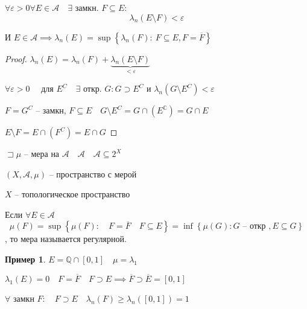\documentclass{book}
\newcommand\Q{\ensuremath{\mathbb{Q}}}
\renewcommand\C{\ensuremath{\mathbb{C}}}
\theoremstyle{definition}
\newtheorem*{example}{Пример}
\begin{document}
\begin{corollary}
    $\forall \varepsilon >0\forall E\in \mathcal A\quad \exists $ замкн. $F \subseteq E:$ \[\lambda_n\left( E \setminus F \right) <\varepsilon\]

    И $E\in\mathcal A \implies   \lambda_n(E) = \sup \left\{ \lambda_n\left( F \right) :\ F\subseteq E, F = \overline{F} \right\} $
\end{corollary}
\begin{proof}
    $\lambda_n(E) = \lambda_n(F) + \underbrace{\lambda_n(E\setminus F)}_{<\varepsilon}$

    $\forall \varepsilon >0\quad $ для $E^C\quad \exists $ откр. $G: G \supset E^C$  и $\lambda_n\left( G \setminus  E^C \right) <\varepsilon$

    $F = G^C$ -- замкн,  $F \subseteq E\quad G \setminus E^C = G \cap \left( E^\C \right)  = G \cap E$

    $E\setminus F = E\cap \left( F^C \right)  = E\cap G$
\end{proof}

\begin{definition}
    $\sqsupset \mu$ -- мера на $\mathcal A\quad \mathcal A \quad \mathcal A \subseteq 2^X$

    $\left( X, \mathcal A, \mu \right) $ -- пространство с мерой

    $X$ -- топологическое пространство
\end{definition}

\begin{definition}
    Если $\forall E\in \mathcal A$ \[\mu(F) = \sup \left\{ \mu(F):\quad F = \overline{F}\quad F \subseteq E \right\}  = \inf \left\{ \mu(G): G \text{ -- откр }, E\subseteq G \right\} \], то мера называется регулярной.
\end{definition}

\begin{example}
    $E = \Q\cap [0,1]\quad \mu = \lambda_1$

    $\lambda_1(E) = 0\quad F = \overline{F}\quad F \supset E \implies \overline{F}\supset \overline {E} = [0,1]$

    $\forall $ замкн $F:\quad F \supset E\quad \lambda_n\left( F \right) \geqslant \lambda_n\left( [0,1] \right)  = 1$ 
\end{example}
\end{document}
